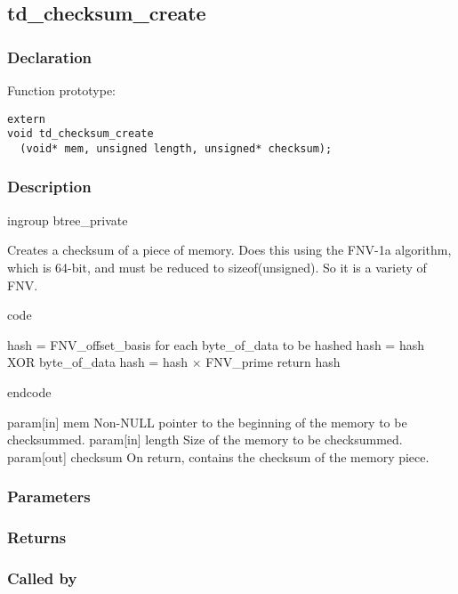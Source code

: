 
\newpage
\subsection{td\_checksum\_create}
\subsubsection{Declaration} Function prototype:

\begin{verbatim}
extern
void td_checksum_create
  (void* mem, unsigned length, unsigned* checksum);
\end{verbatim}

\subsubsection{Description}


 ingroup btree\_private

 Creates a checksum of a piece of memory.
 Does this using the FNV-1a algorithm, which is 64-bit, and
 must be reduced to sizeof(unsigned). So it is a variety of FNV.

 code

   hash = FNV\_offset\_basis
   for each byte\_of\_data to be hashed
        hash = hash XOR byte\_of\_data
        hash = hash × FNV\_prime
   return hash

 endcode

 param[in] mem Non-NULL pointer to the beginning of the memory
 to be checksummed.
 param[in] length Size of the memory to be checksummed.
 param[out] checksum On return, contains the checksum of the memory piece.
 

\subsubsection{Parameters}
\subsubsection{Returns}
\subsubsection{Called by}

